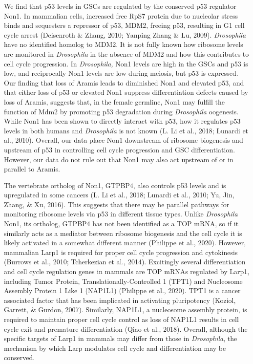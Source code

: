 \documentclass[12pt,oneside]{reedthesis}
\begin{document}
We find that p53 levels in GSCs are regulated by the conserved p53 regulator Non1. In mammalian cells, increased free RpS7 protein due to nucleolar stress binds and sequesters a repressor of p53, MDM2, freeing p53, resulting in G1 cell cycle arrest (Deisenroth \& Zhang, 2010; Yanping Zhang \& Lu, 2009). \emph{Drosophila} have no identified homolog to MDM2. It is not fully known how ribosome levels are monitored in \emph{Drosophila} in the absence of MDM2 and how this contributes to cell cycle progression. In \emph{Drosophila,} Non1 levels are high in the GSCs and p53 is low, and reciprocally Non1 levels are low during meiosis, but p53 is expressed. Our finding that loss of Aramis leads to diminished Non1 and elevated p53, and that either loss of p53 or elevated Non1 suppress differentiation defects caused by loss of Aramis, suggests that, in the female germline, Non1 may fulfill the function of Mdm2 by promoting p53 degradation during \emph{Drosophila} oogenesis. While Non1 has been shown to directly interact with p53, how it regulates p53 levels in both humans and \emph{Drosophila} is not known (L. Li et al., 2018; Lunardi et al., 2010). Overall, our data place Non1 downstream of ribosome biogenesis and upstream of p53 in controlling cell cycle progression and GSC differentiation. However, our data do not rule out that Non1 may also act upstream of or in parallel to Aramis.

The vertebrate ortholog of Non1, GTPBP4, also controls p53 levels and is upregulated in some cancers (L. Li et al., 2018; Lunardi et al., 2010; Yu, Jin, Zhang, \& Xu, 2016). This suggests that there may be parallel pathways for monitoring ribosome levels via p53 in different tissue types. Unlike \emph{Drosophila} Non1, its ortholog, GTPBP4 has not been identified as a TOP mRNA, so if it similarly acts as a mediator between ribosome biogenesis and the cell cycle it is likely activated in a somewhat different manner (Philippe et al., 2020). However, mammalian Larp1 is required for proper cell cycle progression and cytokinesis (Burrows et al., 2010; Tcherkezian et al., 2014). Excitingly several differentiation and cell cycle regulation genes in mammals are TOP mRNAs regulated by Larp1, including Tumor Protein, Translationally-Controlled 1 (TPT1) and Nucleosome Assembly Protein 1 Like 1 (NAP1L1) (Philippe et al., 2020). TPT1 is a cancer associated factor that has been implicated in activating pluripotency (Koziol, Garrett, \& Gurdon, 2007). Similarly, NAP1L1, a nucleosome assembly protein, is required to maintain proper cell cycle control as loss of NAP1L1 results in cell cycle exit and premature differentiation (Qiao et al., 2018). Overall, although the specific targets of Larp1 in mammals may differ from those in \emph{Drosophila}, the mechanism by which Larp modulates cell cycle and differentiation may be conserved.
\end{document}
